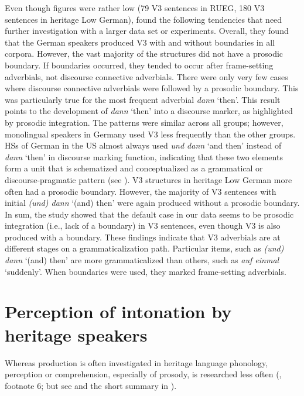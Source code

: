 \documentclass[output=paper,colorlinks,citecolor=brown]{langscibook}
\begin{document}
Even though figures were rather low (79 V3 sentences in RUEG, 180 V3 sentences in heritage Low German), \citet{Bunk_Rocker_inprep} found the following tendencies that need further investigation with a larger data set or experiments. Overall, they found that the German speakers produced V3 with and without boundaries in all corpora. However, the vast majority of the structures did not have a prosodic boundary. If boundaries occurred, they tended to occur after frame-setting adverbials, not discourse connective adverbials. There were only very few cases where discourse connective adverbials were followed by a prosodic boundary. This was particularly true for the most frequent adverbial \textit{dann} ‘then’. This result points to the development of \textit{dann} ‘then’ into a discourse marker, as highlighted by prosodic integration. The patterns were similar across all groups; however, monolingual speakers in Germany used V3 less frequently than the other groups. HSs of German in the US almost always used \textit{und dann} ‘and then’ instead of \textit{dann} ‘then’ in discourse marking function, indicating that these two elements form a unit that is schematized and conceptualized as a grammatical or discourse-pragmatic pattern (see \cite{Haspelmath_2002}). V3 structures in heritage Low German more often had a prosodic boundary. However, the majority of V3 sentences with initial \textit{(und) dann} ‘(and) then’ were again produced without a prosodic boundary. In sum, the study showed that the default case in our data seems to be prosodic integration (i.e., lack of a boundary) in V3 sentences, even though V3 is also produced with a boundary. These findings indicate that V3 adverbials are at different stages on a grammaticalization path. Particular items, such as \textit{(und) dann} ‘(and) then’ are more grammaticalized than others, such as \textit{auf einmal} ‘suddenly’. When boundaries were used, they marked frame-setting adverbials.


\section{Perception of intonation by heritage speakers} \label{chapter12:section 5}

Whereas production is often investigated in heritage language phonology, perception or comprehension, especially of prosody, is researched less often (\cite{Polinsky_Scontras_2019}, footnote 6; but see \cite{Sekerina_Trueswell_2011} and the short summary in \cite[158--162]{Polinsky_2018}).
\end{document}
